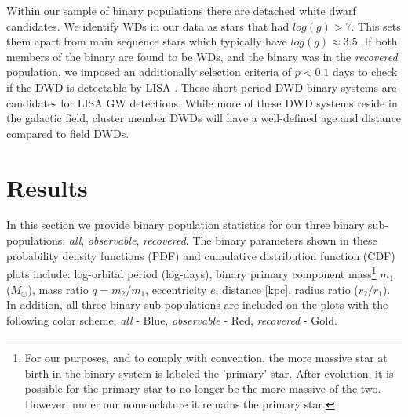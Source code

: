 \documentclass[twocolumn]{aastex63}
\begin{document}
Within our sample of binary populations there are detached white dwarf candidates. 
We identify WDs in our data as stars that had $log(g) > 7$. This sets them apart from main sequence stars which typically have $log(g) \approx 3.5$. If both members of the binary are found to be WDs, and the binary was in the \textit{recovered} population, we imposed an additionally selection criteria of $p < 0.1$ days to check if the DWD is detectable by LISA \citep{2017MNRAS.470.1894K}. These short period DWD binary systems are candidates for LISA GW detections. While more of these DWD systems reside in the galactic field, cluster member DWDs will have a well-defined age and distance compared to field DWDs. 


\section{Results} \label{sec:Results}
In this section we provide binary population statistics for our three binary sub-populations: \textit{all}, \textit{observable}, \textit{recovered}. The binary parameters shown in these probability density functions (PDF) and cumulative distribution function (CDF) plots include: log-orbital period (log-days), binary primary component mass\footnote{For our purposes, and to comply with convention, the more massive star  at birth in the binary system is labeled the 'primary' star. After evolution, it is possible for the primary star to no longer be the more massive of the two. However, under our nomenclature it remains the primary star.} \textit{$m_1$} ($M_{\odot}$), mass ratio $q=m_2/m_1$, eccentricity $e$, distance [kpc], radius ratio ($r_2/r_1$). In addition, all three binary sub-populations are included on the plots with the following color scheme: \textit{all} - Blue, \textit{observable} - Red, \textit{recovered} - Gold.
\end{document}
